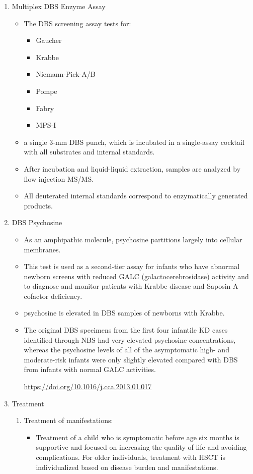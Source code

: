 \documentclass{scrartcl}
\begin{document}
\begin{enumerate}
\item Multiplex DBS  Enzyme Assay
\label{sec:orga41809c}
\begin{itemize}
\item The DBS screening assay tests for:
\begin{itemize}
\item Gaucher
\item Krabbe
\item Niemann-Pick-A/B
\item Pompe
\item Fabry
\item MPS-I
\end{itemize}
\item a single 3-mm DBS punch, which is incubated in a single-assay
cocktail with all substrates and internal standards.
\item After incubation and liquid-liquid extraction, samples are analyzed by flow injection MS/MS.
\item All deuterated internal standards correspond to enzymatically generated products.
\end{itemize}


\item DBS Psychosine
\label{sec:org3ff1709}
\begin{itemize}
\item As an amphipathic molecule, psychosine partitions largely into
cellular membranes.
\item This test is used as a second-tier assay for infants who have
abnormal newborn screens with reduced GALC (galactocerebrosidase)
activity and to diagnose and monitor patients with Krabbe disease
and Saposin A cofactor deficiency.

\item psychosine is elevated in DBS samples of newborns with Krabbe.

\item The original DBS specimens from the first four infantile
KD cases identified through NBS had very elevated psychosine
concentrations, whereas the psychosine levels of all of the
asymptomatic high- and moderate-risk infants were only slightly
elevated compared with DBS from infants with normal GALC activities.

\url{https://doi.org/10.1016/j.cca.2013.01.017}
\end{itemize}


\item Treatment
\label{sec:org39b10e9}

\begin{enumerate}
\item Treatment of manifestations:
\label{sec:org21e96c6}
\begin{itemize}
\item Treatment of a child who is symptomatic before age six months is
supportive and focused on increasing the quality of life and
avoiding complications. For older individuals, treatment with HSCT
is individualized based on disease burden and manifestations.
\end{itemize}


\end{enumerate}
\end{enumerate}
\end{document}
